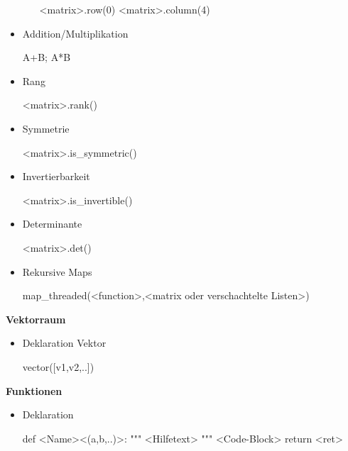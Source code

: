\documentclass[a4paper,9pt,DIV15,twocolumn]{scrartcl}
\begin{document}
\begin{itemize}
\begin{itemize}
\begin{sagein}
<matrix>.row(0)
<matrix>.column(4)
\end{sagein}
\end{itemize}
\item Addition/Multiplikation
\begin{sagein}
A+B; A*B
\end{sagein}
\item Rang
\begin{sagein}
<matrix>.rank()        
\end{sagein}
\item Symmetrie 
\begin{sagein}
<matrix>.is_symmetric() 
\end{sagein}
\item Invertierbarkeit
    \begin{sagein}
<matrix>.is_invertible()
    \end{sagein}
\item Determinante
\begin{sagein}
<matrix>.det()
\end{sagein}
\item Rekursive Maps
\begin{sagein}
map_threaded(<function>,<matrix oder verschachtelte Listen>)
\end{sagein}
\end{itemize}

\textbf{Vektorraum}

\begin{itemize}
 \item Deklaration Vektor
\begin{sagein}
vector([v1,v2,..]) 
\end{sagein}

\end{itemize}

\textbf{Funktionen}

\begin{itemize}
 \item Deklaration
\begin{sagein}
def <Name><(a,b,..)>:
    """ <Hilfetext> """
    <Code-Block>
    return <ret>
\end{sagein}
\end{itemize}
\end{document}
